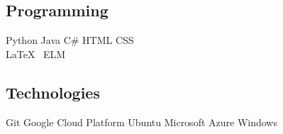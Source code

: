 \documentclass[]{farzad-resume}
\begin{document}
\begin{minipage}[t]{0.30\textwidth}
\subsection{Programming}
Python \textbullet{} Java \textbullet{} C\# \textbullet {}  HTML\textbullet{} CSS \\ 
\LaTeX\ \textbullet{} ELM\\
\sectionsep

\subsection{Technologies}
Git \textbullet{} Google Cloud Platform \textbullet{} Ubuntu  \textbullet{} Microsoft Azure \textbullet{} Windows
\sectionsep

%
%

\end{minipage}
\hfill
\end{document}
